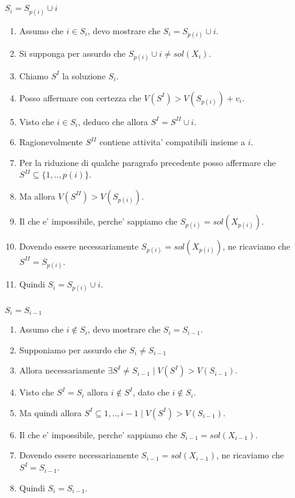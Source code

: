 \subparagraph{}
\textbf{$S_i = S_{p(i)} \cup {i}$} \\
\begin{enumerate}
    \item Assumo che $i \in S_i$, devo mostrare che $S_i = S_{p(i)} \cup {i}$. \\
    \item Si supponga per assurdo che $S_{p(i)} \cup {i} \ne sol(X_i)$. \\
    \item Chiamo $S^I$ la soluzione ${S_i}$. \\
    \item Posso affermare con certezza che $V(S^I) > V(S_{p(i)}) + v_i$. \\
    \item Visto che $i \in S_i$, deduco che allora $S^I = S^{II} \cup {i}$. \\
    \item Ragionevolmente $S^{II}$ contiene attivita' compatibili insieme a $i$. \\
    \item Per la riduzione di qualche paragrafo precedente posso affermare che $S^{II} \subseteq \{1,..,p(i)\}$.
    \item Ma allora $V(S^{II}) > V(S_{p(i)})$. \\
    \item Il che e' impossibile, perche' sappiamo che $S_{p(i)} = sol(X_{p(i)})$. \\
    \item Dovendo essere necessariamente $S_{p(i)} = sol(X_{p(i)})$, ne ricaviamo che $S^{II} = S_{p(i)}$.
    \item Quindi $S_i = S_{p(i)} \cup {i}$.
\end{enumerate}

\subparagraph{}
\textbf{$S_i = S_{i-1}$} \\

\begin{enumerate}
    \item Assumo che $i \notin S_i$, devo mostrare che $S_i = S_{i-1}$. \\
    \item Supponiamo per assurdo che $S_i \ne S_{i-1}$ \\
    \item Allora necessariamente $\exists S^I \ne S_{i-1} \mid V(S^I) > V(S_{i-1})$. \\
    \item Visto che $S^I = S_i$ allora $i \notin S^I$, dato che $i \notin S_i$. \\
    \item Ma quindi allora $S^I \subseteq {1,..,i-1} \mid V(S^I) > V(S_{i-1})$.
    \item Il che e' impossibile, perche' sappiamo che $S_{i-1} = sol(X_{i-1})$. \\
    \item Dovendo essere necessariamente $S_{i-1} = sol(X_{i-1})$, ne ricaviamo che $S^{I} = S_{i-1}$. \\
    \item Quindi $S_i = S_{i-1}$.
\end{enumerate}


